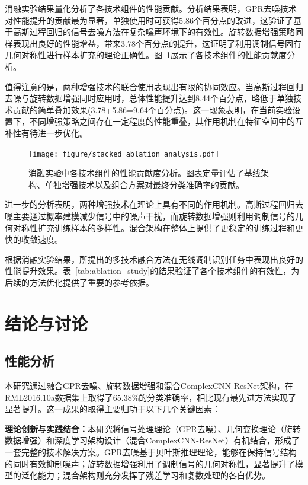 \documentclass[conference]{IEEEtran}
\begin{document}
消融实验结果量化分析了各技术组件的性能贡献。分析结果表明，GPR去噪技术对性能提升的贡献最为显著，单独使用时可获得5.86个百分点的改进，这验证了基于高斯过程回归的信号去噪方法在复杂噪声环境下的有效性。旋转数据增强策略同样表现出良好的性能增益，带来3.78个百分点的提升，这证明了利用调制信号固有几何对称性进行样本扩充的理论正确性。图~\ref{fig:ablation_components}展示了各技术组件的性能贡献度分析。

值得注意的是，两种增强技术的联合使用表现出有限的协同效应。当高斯过程回归去噪与旋转数据增强同时应用时，总体性能提升达到8.44个百分点，略低于单独技术贡献的简单叠加效果(3.78+5.86=9.64个百分点)。这一现象表明，在当前实验设置下，不同增强策略之间存在一定程度的性能重叠，其作用机制在特征空间中的互补性有待进一步优化。

\begin{figure}[htbp]
\centering
\texttt{[image: figure/stacked\_ablation\_analysis.pdf]}
\caption{消融实验中各技术组件的性能贡献度分析。图表定量评估了基线架构、单独增强技术以及组合方案对最终分类准确率的贡献。}
\label{fig:ablation_components}
\end{figure}

进一步的分析表明，两种增强技术在理论上具有不同的作用机制。高斯过程回归去噪主要通过概率建模减少信号中的噪声干扰，而旋转数据增强则利用调制信号的几何对称性扩充训练样本的多样性。混合架构在整体上提供了更稳定的训练过程和更快的收敛速度。



根据消融实验结果，所提出的多技术融合方法在无线调制识别任务中表现出良好的性能提升效果。表~\ref{tab:ablation_study}的结果验证了各个技术组件的有效性，为后续的方法优化提供了重要的参考依据。

\section{结论与讨论}

\subsection{性能分析}

本研究通过融合GPR去噪、旋转数据增强和混合ComplexCNN-ResNet架构，在RML2016.10a数据集上取得了65.38\%的分类准确率，相比现有最先进方法实现了显著提升。这一成果的取得主要归功于以下几个关键因素：

\textbf{理论创新与实践结合：}本研究将信号处理理论（GPR去噪）、几何变换理论（旋转数据增强）和深度学习架构设计（混合ComplexCNN-ResNet）有机结合，形成了一套完整的技术解决方案。GPR去噪基于贝叶斯推理理论，能够在保持信号结构的同时有效抑制噪声；旋转数据增强利用了调制信号的几何对称性，显著提升了模型的泛化能力；混合架构则充分发挥了残差学习和复数处理的各自优势。
\end{document}
